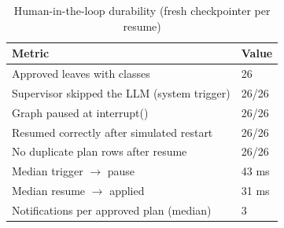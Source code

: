 \begin{table}[t]
\centering
\small
\begin{tabular}{ll}
\toprule
Metric & Value \\
\midrule
Approved leaves with classes & 26 \\
Supervisor skipped the LLM (system trigger) & 26/26 \\
Graph paused at interrupt() & 26/26 \\
Resumed correctly after simulated restart & 26/26 \\
No duplicate plan rows after resume & 26/26 \\
Median trigger $\rightarrow$ pause & 43 ms \\
Median resume $\rightarrow$ applied & 31 ms \\
Notifications per approved plan (median) & 3 \\
\bottomrule
\end{tabular}
\caption{Human-in-the-loop durability (fresh checkpointer per resume)}
\label{tab:t10-hitl}
\end{table}
